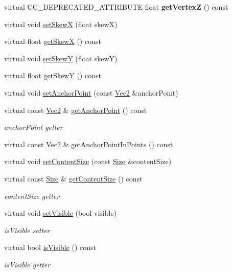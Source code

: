 \begin{Indent}
\begin{DoxyCompactItemize}
virtual C\+C\+\_\+\+D\+E\+P\+R\+E\+C\+A\+T\+E\+D\+\_\+\+A\+T\+T\+R\+I\+B\+U\+TE float {\bfseries get\+VertexZ} () const
\item 
virtual void \hyperlink{classNode_a48cf4d7b304b57a3f593d9eecde3ac7f}{set\+SkewX} (float skewX)
\item 
virtual float \hyperlink{classNode_adb23628a9cef9c16cfcfd955a51ac8bd}{get\+SkewX} () const
\item 
virtual void \hyperlink{classNode_ac1f4c4be8099a0d4bca1464c51f81f94}{set\+SkewY} (float skewY)
\item 
virtual float \hyperlink{classNode_a260877f2b51c284555fc272c7ba28f46}{get\+SkewY} () const
\item 
virtual void \hyperlink{classNode_a4dd45cb48a51df7c257675f527e3f277}{set\+Anchor\+Point} (const \hyperlink{classVec2}{Vec2} \&anchor\+Point)
\item 
virtual const \hyperlink{classVec2}{Vec2} \& \hyperlink{classNode_a391027410f7f45889938090feb631cba}{get\+Anchor\+Point} () const
\begin{DoxyCompactList}\small\item\em anchor\+Point getter \end{DoxyCompactList}\item 
virtual const \hyperlink{classVec2}{Vec2} \& \hyperlink{classNode_a288b900788ed2db5eddb9d84751a3602}{get\+Anchor\+Point\+In\+Points} () const
\item 
virtual void \hyperlink{classNode_ade113d7fc9244f58ac98a4712da49818}{set\+Content\+Size} (const \hyperlink{classSize}{Size} \&content\+Size)
\item 
virtual const \hyperlink{classSize}{Size} \& \hyperlink{classNode_a3828836a62dbf0862ecaa99a72babc13}{get\+Content\+Size} () const
\begin{DoxyCompactList}\small\item\em content\+Size getter \end{DoxyCompactList}\item 
virtual void \hyperlink{classNode_ad8d9f6f838941a2a8ae18420757af158}{set\+Visible} (bool visible)
\begin{DoxyCompactList}\small\item\em is\+Visible setter \end{DoxyCompactList}\item 
virtual bool \hyperlink{classNode_accff189524c62c6cb446cc19e3a79ab4}{is\+Visible} () const
\begin{DoxyCompactList}\small\item\em is\+Visible getter \end{DoxyCompactList}\item 

\end{DoxyCompactItemize}
\end{Indent}
